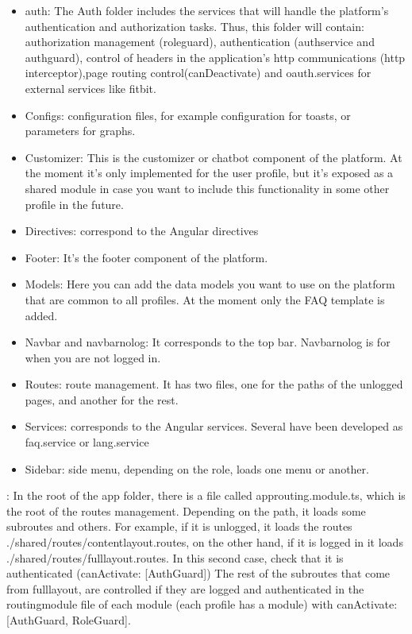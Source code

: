 \documentclass[letterpaper,10pt,english]{sphinxmanual}
\begin{document}
\begin{itemize}
\item {} 
auth: The Auth folder includes the services that will handle the platform’s authentication and authorization tasks. Thus, this folder will contain: authorization management (role\sphinxhyphen{}guard), authentication (auth\sphinxhyphen{}service and auth\sphinxhyphen{}guard), control of headers in the application’s http communications
(http interceptor),page routing control(canDeactivate) and oauth.services for external services like fitbit.

\item {} 
Configs: configuration files, for example configuration for toasts, or parameters for graphs.

\item {} 
Customizer: This is the customizer or chatbot component of the platform. At the moment it’s only implemented for the user profile, but it’s exposed as a shared module in case you want to include this functionality in some other profile in the future.

\item {} 
Directives: correspond to the Angular directives

\item {} 
Footer: It’s the footer component of the platform.

\item {} 
Models: Here you can add the data models you want to use on the platform that are common to all profiles. At the moment only the FAQ template is added.

\item {} 
Navbar and navbar\sphinxhyphen{}nolog: It corresponds to the top bar. Navbar\sphinxhyphen{}nolog is for when you are not logged in.

\item {} 
Routes: route management. It has two files, one for the paths of the unlogged pages, and another for the rest.

\item {} 
Services: corresponds to the Angular services. Several have been developed as faq.service or lang.service

\item {} 
Sidebar: side menu, depending on the role, loads one menu or another.

\end{itemize}

: In the root of the app folder, there is a file called app\sphinxhyphen{}routing.module.ts, which is the root of the routes management. Depending on the path, it loads some subroutes and others. For example, if it is unlogged, it loads the routes ./shared/routes/content\sphinxhyphen{}layout.routes, on the other hand, if it is logged in it loads ./shared/routes/full\sphinxhyphen{}layout.routes. In this second case, check that it is authenticated (canActivate: {[}AuthGuard{]})
The rest of the subroutes that come from full\sphinxhyphen{}layout, are controlled if they are logged and authenticated in the routing\sphinxhyphen{}module file of each module (each profile has a module) with canActivate: {[}AuthGuard, RoleGuard{]}.
\end{document}

